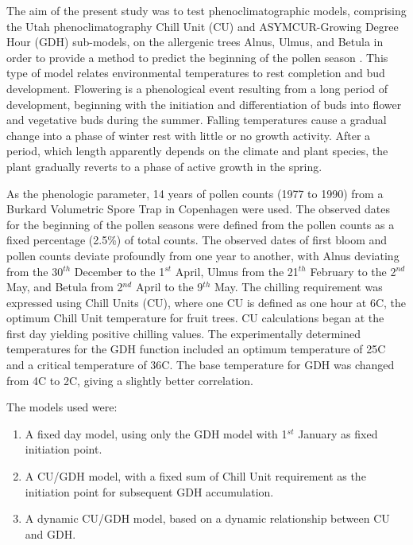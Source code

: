 The aim of the present study was to test phenoclimatographic models, comprising the Utah phenoclimatography Chill Unit (CU) and ASYMCUR-Growing Degree Hour (GDH) sub-models, on the allergenic trees Alnus, Ulmus, and Betula in order to provide a method to predict the beginning of the pollen season \cite*{rm_04_L05_model_predict_pollen_season}. This type of model relates environmental temperatures to rest completion and bud development. Flowering is a phenological event resulting from a long period of development, beginning with the initiation and differentiation of buds into flower and vegetative buds during the summer. Falling temperatures cause a gradual change into a phase of winter rest with little or no growth activity. After a period, which length apparently depends on the climate and plant species, the plant gradually reverts to a phase of active growth in the spring.

\vspace{0.5em}
As the phenologic parameter, 14 years of pollen counts (1977 to 1990) from a Burkard Volumetric Spore Trap in Copenhagen were used. The observed dates for the beginning of the pollen seasons were defined from the pollen counts as a fixed percentage (2.5\%) of total counts. The observed dates of first bloom and pollen counts deviate profoundly from one year to another, with Alnus deviating from the 30$^{th}$ December to the 1$^{st}$ April, Ulmus from the 21$^{th}$ February to the 2$^{nd}$ May, and Betula from 2$^{nd}$ April to the 9$^{th}$ May. The chilling requirement was expressed using Chill Units (CU), where one CU is defined as one hour at 6\textdegree C, the optimum Chill Unit temperature for fruit trees. CU calculations began at the first day yielding positive chilling values. The experimentally determined temperatures for the GDH function included an optimum temperature of 25\textdegree C and a critical temperature of 36\textdegree C. The base temperature for GDH was changed from 4\textdegree C to 2\textdegree C, giving a slightly better correlation.

\vspace{0.5em}
The models used were: 

\begin{enumerate} 
    \item A fixed day model, using only the GDH model with 1$^{st}$ January as fixed initiation point.
    \item A CU/GDH model, with a fixed sum of Chill Unit requirement as the initiation point for subsequent GDH accumulation. 
    \item A dynamic CU/GDH model, based on a dynamic relationship between CU and GDH. 
\end{enumerate}

